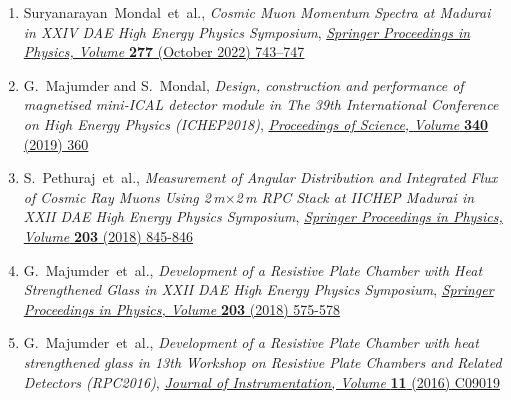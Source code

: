 \documentclass[12pt]{article}
\begin{document}
\begin{minipage}{1.05\textwidth}
\begin{enumerate}[b.]
\begin{enumerate}[1.]
    \item Suryanarayan~Mondal~et~al., \emph{Cosmic Muon Momentum Spectra at Madurai in XXIV DAE High Energy Physics Symposium}, \href{https://doi.org/10.1007/978-981-19-2354-8_134}{\emph{Springer Proceedings in Physics, Volume } \textbf{277} (October 2022) 743--747}
    \item G.~Majumder and S.~Mondal, \emph{Design, construction and performance of magnetised mini-ICAL detector module in The 39th International Conference on High Energy Physics (ICHEP2018)}, \href{https://doi.org/10.22323/1.340.0360}{\emph{Proceedings of Science,} \textit{Volume} \textbf{340} (2019) 360}
    \item S.~Pethuraj~et~al., \emph{Measurement of Angular Distribution and Integrated Flux of Cosmic Ray Muons Using 2\,m$\times$2\,m RPC Stack at IICHEP Madurai in XXII DAE High Energy Physics Symposium}, \href{https://doi.org/10.1007/978-3-319-73171-1_205}{\emph{Springer Proceedings in Physics,} \emph{Volume} \textbf{203} (2018) 845-846}
    \item G.~Majumder~et~al., \emph{Development of a Resistive Plate Chamber with Heat Strengthened Glass in XXII DAE High Energy Physics Symposium}, \href{https://doi.org/10.1007/978-3-319-73171-1_135}{\emph{Springer Proceedings in Physics, Volume} \textbf{203} (2018) 575-578}
    \item  G.~Majumder~et~al., \emph{Development of a Resistive Plate Chamber with heat strengthened glass in 13th Workshop on Resistive Plate Chambers and Related Detectors (RPC2016)}, \href{https://doi.org/10.1088/1748-0221/11/09/C09019}{\emph{Journal of Instrumentation, Volume} \textbf{11} (2016) C09019}
    \end{enumerate}
  \end{enumerate}
\end{minipage}
\newpage
\end{document}
